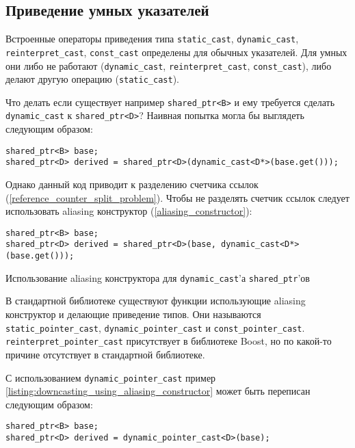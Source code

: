 \subsection{Приведение умных указателей}

Встроенные операторы приведения типа \texttt{static_cast}, \texttt{dynamic_cast}, \texttt{reinterpret_cast}, \texttt{const_cast} определены для обычных указателей. Для умных они либо не работают (\texttt{dynamic_cast}, \texttt{reinterpret_cast}, \texttt{const_cast}), либо делают другую операцию (\texttt{static_cast}).

Что делать если существует например \texttt{shared_ptr<B>} и ему требуется сделать \texttt{dynamic_cast} к \texttt{shared_ptr<D>}? Наивная попытка могла бы выглядеть следующим образом:

\begin{verbatim}
shared_ptr<B> base;
shared_ptr<D> derived = shared_ptr<D>(dynamic_cast<D*>(base.get()));
\end{verbatim}

Однако данный код приводит к разделению счетчика ссылок (\ref{reference_counter_split_problem}). Чтобы не разделять счетчик ссылок следует использовать aliasing конструктор (\ref{aliasing_constructor}):

\begin{listing}
\begin{verbatim}
shared_ptr<B> base;
shared_ptr<D> derived = shared_ptr<D>(base, dynamic_cast<D*>(base.get()));
\end{verbatim}
\caption{Использование aliasing конструктора для \texttt{dynamic_cast}'а \texttt{shared_ptr}'ов}
\label{listing:downcasting_using_aliasing_constructor}
\end{listing}

В стандартной библиотеке существуют функции использующие aliasing конструктор и делающие приведение типов. Они называются \texttt{static_pointer_cast}, \texttt{dynamic_pointer_cast} и \texttt{const_pointer_cast}. \texttt{reinterpret_pointer_cast} присутствует в библиотеке Boost, но по какой-то причине отсутствует в стандартной библиотеке.

С использованием \texttt{dynamic_pointer_cast} пример \ref{listing:downcasting_using_aliasing_constructor} может быть переписан следующим образом:
\begin{verbatim}
shared_ptr<B> base;
shared_ptr<D> derived = dynamic_pointer_cast<D>(base);
\end{verbatim}

